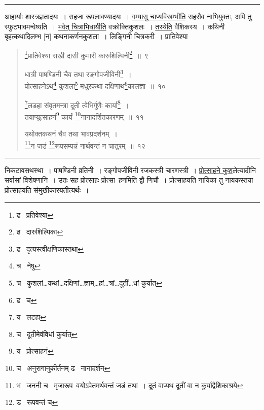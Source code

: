 \documentclass[11pt, openany]{book}
\begin{document}
\hrule

\vspace{2mm}
{\footnotesize आहार्याः शास्त्रज्ञतादयः~। सहजा रूपलावण्यादयः~। \underline{गम्यासु चाप्यविस्रम्भीति} सहसैव नाभियुक्तः, अपि तु स्फुटभावमन्वेष्यति~। \underline{भवेत् चित्राभिधायीति} वक्रोक्तिकुशलः~। \underline{तस्येति} वैशिकस्य~। कथिनी बृहत्कथादिलम्भ [न] कथनाकर्णनकुशला~। लिङ्गिनी चित्रकरी~। प्रातिवेश्या}


\newpage

\begin{quote}
{\na \renewcommand{\thefootnote}{1}\footnote{ढ \textendash\  प्रतिवेश्या}प्रातिवेश्या सखी दासी कुमारी कारुशिल्पिनी\renewcommand{\thefootnote}{2}\footnote{ढ \textendash\  दारुशिल्पिका}~॥~९

धात्री पाषण्डिनी चैव तथा रङ्गोपजीविनी\renewcommand{\thefootnote}{3}\footnote{ढ \textendash\  दृत्यस्त्वीक्षणिकास्तथा}~।\\
प्रोत्साहनेऽथ\renewcommand{\thefootnote}{4}\footnote{च \textendash\  नेषु} कुशला\renewcommand{\thefootnote}{5}\footnote{च \textendash\  कुशलां\ldots कथां\ldots दक्षिणां\ldots ज्ञाम्\ldots हां\ldots त्रां\ldots दूतीं\ldots धां कुर्यात्} मधुरकथा दक्षिणाथ\renewcommand{\thefootnote}{6}\footnote{ढ \textendash\  च}कालज्ञा~॥~१०

\renewcommand{\thefootnote}{7}\footnote{य \textendash\  लटहा}लडहा संवृतमन्त्रा दूती त्वेभिर्गुणैः कार्या\renewcommand{\thefootnote}{8}\footnote{च \textendash\  दूतीमेवंविधां कुर्यात्}~।\\
तयाप्युत्साहनं\renewcommand{\thefootnote}{9}\footnote{य \textendash\  प्रोत्साहनं} कार्यं \renewcommand{\thefootnote}{10}\footnote{च \textendash\  अनुरागानुकीर्तनम् ढ \textendash\  नानादर्शन}नानादर्शितकारणम्~॥~११

यथोक्तकथनं चैव तथा भावप्रदर्शनम्~।\\
\renewcommand{\thefootnote}{11}\footnote{भ \textendash\  जननी च \textendash\  मृजारूप\textendash\ वयोऽपेतमर्थवन्तं जडं तथा~। दूतं वाप्यथ दूतीं वा न कुर्याद्वैशिकाश्रये}न जडं \renewcommand{\thefootnote}{12}\footnote{ड \textendash\  रूपवन्तं च}रूपसम्पन्नं नार्थवन्तं न चातुरम्~॥~१२}
\end{quote}

\hrule

\vspace{2mm}
\noindent
निकटावसथस्था~। पाषण्डिनी व्रतिनी~। रङ्गोपजीविनी रजकस्त्री चारणस्त्री~। \underline{प्रोत्साहने कुश}लेत्यादीनि सर्वासां विशेषणानि~। उतः सह प्रोत्साहः प्रोत्सा\textendash\ हनमिति द्वौ णिचौ~। प्रोत्साहयति नायिका तु नायकस्तया प्रोत्साहयति संमुखीकारयतीत्यर्थः~।\\
\end{document}
